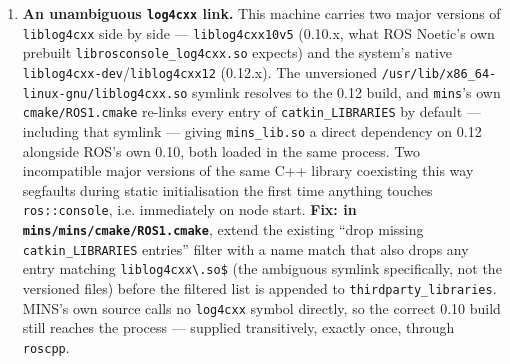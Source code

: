 \documentclass[11pt]{report}
\begin{document}
\begin{enumerate}
\begin{lstlisting}[style=shell]
source /opt/ros/noetic/setup.bash
cd mins_sandbox/catkin_ws
source devel/setup.bash
catkin build
\end{lstlisting}
\item \textbf{An unambiguous \texttt{log4cxx} link.} This machine carries
  two major versions of \texttt{liblog4cxx} side by side ---
  \texttt{liblog4cxx10v5} (0.10.x, what ROS Noetic's own prebuilt
  \texttt{librosconsole\_log4cxx.so} expects) and the system's native
  \texttt{liblog4cxx-dev}/\texttt{liblog4cxx12} (0.12.x). The unversioned
  \texttt{/usr/lib/x86\_64-linux-gnu/liblog4cxx.so} symlink resolves to the
  0.12 build, and \texttt{mins}'s own \texttt{cmake/ROS1.cmake} re-links
  every entry of \texttt{catkin\_LIBRARIES} by default --- including that
  symlink --- giving \texttt{mins\_lib.so} a direct dependency on 0.12
  alongside ROS's own 0.10, both loaded in the same process. Two
  incompatible major versions of the same C++ library coexisting this way
  segfaults during static initialisation the first time anything touches
  \texttt{ros::console}, i.e. immediately on node start. \textbf{Fix: in
  \texttt{mins/mins/cmake/ROS1.cmake}}, extend the existing
  ``drop missing \texttt{catkin\_LIBRARIES} entries'' filter with a name
  match that also drops any entry matching \texttt{liblog4cxx\textbackslash{}.so\$}
  (the ambiguous symlink specifically, not the versioned files) before the
  filtered list is appended to \texttt{thirdparty\_libraries}. MINS's own
  source calls no \texttt{log4cxx} symbol directly, so the correct 0.10
  build still reaches the process --- supplied transitively, exactly once,
  through \texttt{roscpp}.
\end{enumerate}
\end{document}
